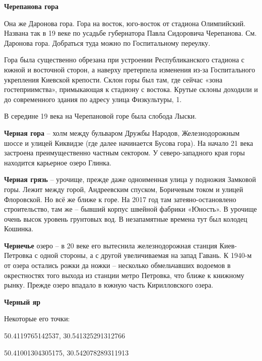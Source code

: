 \medskip

\textbf{Черепанова гора}

Она же Даронова гора. Гора на восток, юго-восток от стадиона Олимпийский. Названа так в 19 веке по усадьбе губернатора Павла Сидоровича Черепанова. См. Даронова гора. Добраться туда можно по Госпитальному переулку.

Гора была существенно обрезана при устроении Республиканского стадиона с южной и восточной сторон, а наверху претерпела изменения из-за Госпитального укрепления Киевской крепости. Склон горы был там, где сейчас «зона гостеприимства», примыкающая к стадиону с востока. Крутые склоны доходили и до современного здания по адресу улица Физкультуры, 1.

В середине 19 века на Черепановой горе была слобода Лыски.\\

\medskip

\textbf{Черная гора} – холм между бульваром Дружбы Народов, Железнодорожным шоссе и улицей Киквидзе (где далее начинается Бусова гора). На начало 21 века застроена преимущественно частным сектором. У северо-западного края горы находится карьерное озеро Глинка.\\

\medskip

\textbf{Черная грязь} – урочище, прежде даже одноименная улица у подножия Замковой горы. Лежит между горой, Андреевским спуском, Боричевым током и улицей Флоровской. Но всё же ближе к горе. На 2017 год там затеяно-остановлено строительство, там же – бывший корпус швейной фабрики «Юность». В урочище очень высок уровень грунтовых вод. В незапамятные времена тут был колодец Кошинка.\\

\medskip

\textbf{Чернечье} озеро – в 20 веке его вытеснила железнодорожная станция Киев-Петровка с одной стороны, а с другой увеличиваемая на запад Гавань. К 1940-м от озера остались рожки да ножки – несколько обмельчавших водоемов в окрестностях того выхода из станции метро Петровка, что ближе к книжному рынку. Прежде озеро впадало в южную часть Кирилловского озера.\\ 

\medskip

\textbf{Черный яр} 

Некоторые его точки:

50.4119765142537, 30.541325291312766

50.41001304305175, 30.542078289311913

